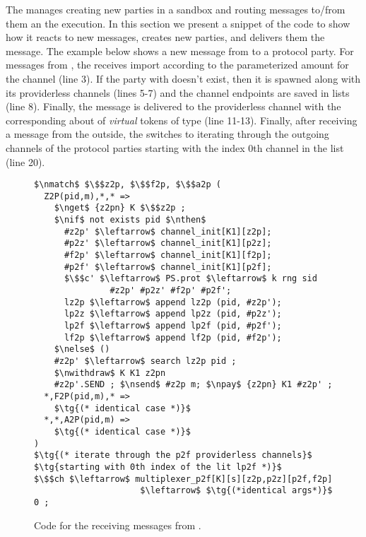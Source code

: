 The \partywrapper manages creating new parties in a sandbox and routing messages to/from them an the execution. 
In this section we present a snippet of the \partywrapper code to show how it reacts to new messages, creates new parties, and delivers them the message.
The example below shows a new message from \Z to a protocol party. 
For messages from \Z, the \partywrapper receives import according to the parameterized amount for the  channel (line 3).
If the party with  doesn't exist, then it is spawned along with its providerless channels (lines 5-7) and the channel endpoints are saved in lists (line 8).  
Finally, the message is delivered to the providerless channel with the corresponding about of \emph{virtual} tokens of type  (line 11-13). 
Finally, after receiving a message from the outside, the \partywrapper switches to iterating through the outgoing channels of the protocol parties starting with the index 0th channel in the  list (line 20).

\begin{figure}[h]
	\centering
	\begin{lstlisting}[basicstyle=\footnotesize\BeraMonottFamily, mathescape, frame=single]
$\nmatch$ $\$$z2p, $\$$f2p, $\$$a2p (
  Z2P(pid,m),*,* =>
    $\nget$ {z2pn} K $\$$z2p ;
    $\nif$ not exists pid $\nthen$
      #z2p' $\leftarrow$ channel_init[K1][z2p]; 
      #p2z' $\leftarrow$ channel_init[K1][p2z];
      #f2p' $\leftarrow$ channel_init[K1][f2p]; 
      #p2f' $\leftarrow$ channel_init[K1][p2f];
      $\$$c' $\leftarrow$ PS.prot $\leftarrow$ k rng sid 
               #z2p' #p2z' #f2p' #p2f';
      lz2p $\leftarrow$ append lz2p (pid, #z2p'); 
      lp2z $\leftarrow$ append lp2z (pid, #p2z');
      lp2f $\leftarrow$ append lp2f (pid, #p2f'); 
      lf2p $\leftarrow$ append lf2p (pid, #f2p');
    $\nelse$ ()
    #z2p' $\leftarrow$ search lz2p pid ;
    $\nwithdraw$ K K1 z2pn
    #z2p'.SEND ; $\nsend$ #z2p m; $\npay$ {z2pn} K1 #z2p' ;
  *,F2P(pid,m),* =>
    $\tg{(* identical case *)}$
  *,*,A2P(pid,m) =>
    $\tg{(* identical case *)}$
)
$\tg{(* iterate through the p2f providerless channels}$
$\tg{starting with 0th index of the lit lp2f *)}$
$\$$ch $\leftarrow$ multiplexer_p2f[K][s][z2p,p2z][p2f,f2p] 
                     $\leftarrow$ $\tg{(*identical args*)}$ 0 ;
	\end{lstlisting}
\caption{Code for the \partywrapper receiving messages from \Z.}
\label{lst:partywrapper}
\end{figure}

